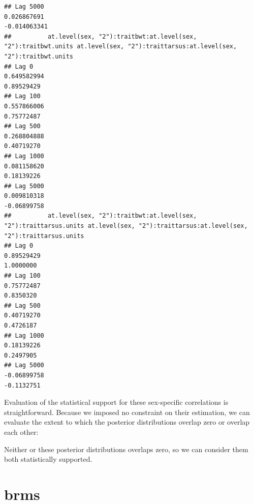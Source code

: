 \documentclass[
  12pt,
]{book}
\begin{document}
\begin{verbatim}
## Lag 5000                                                      0.026867691                                                        -0.014063341
##          at.level(sex, "2"):traitbwt:at.level(sex, "2"):traitbwt.units at.level(sex, "2"):traittarsus:at.level(sex, "2"):traitbwt.units
## Lag 0                                                      0.649582994                                                       0.89529429
## Lag 100                                                    0.557866006                                                       0.75772487
## Lag 500                                                    0.268804888                                                       0.40719270
## Lag 1000                                                   0.081158620                                                       0.18139226
## Lag 5000                                                   0.009810318                                                      -0.06899758
##          at.level(sex, "2"):traitbwt:at.level(sex, "2"):traittarsus.units at.level(sex, "2"):traittarsus:at.level(sex, "2"):traittarsus.units
## Lag 0                                                          0.89529429                                                           1.0000000
## Lag 100                                                        0.75772487                                                           0.8350320
## Lag 500                                                        0.40719270                                                           0.4726187
## Lag 1000                                                       0.18139226                                                           0.2497905
## Lag 5000                                                      -0.06899758                                                          -0.1132751
\end{verbatim}

Evaluation of the statistical support for these sex-specific correlations is straightforward. Because we imposed no constraint on their estimation, we can evaluate the extent to which the posterior distributions overlap zero or overlap each other:

Neither or these posterior distributions overlaps zero, so we can consider them both statistically supported.

\hypertarget{brms-2}{%
\section{brms}\label{brms-2}}
\end{document}
